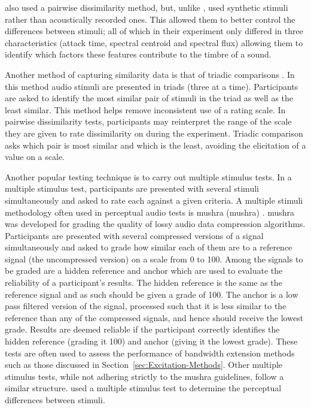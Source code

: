 			\citet{caclin2005acoustic} also used a pairwise dissimilarity method, but, unlike
			\citet{grey1977multidimensional}, used synthetic stimuli rather than acoustically recorded ones.
			This allowed them to better control the differences between stimuli; all of which in their
			experiment only differed in three characteristics (attack time, spectral centroid and spectral
			flux) allowing them to identify which factors these features contribute to the timbre of a sound.

			Another method of capturing similarity data is that of triadic comparisons
			\citep{wickelmaier2007deriving}. In this method audio stimuli are presented in triads (three at a
			time). Participants are asked to identify the most similar pair of stimuli in the triad as well as
			the least similar. This method helps remove inconsistent use of a rating scale. In pairwise
			dissimilarity tests, participants may reinterpret the range of the scale they are given to rate
			dissimilarity on during the experiment. Triadic comparison asks which pair is most similar and
			which is the least, avoiding the elicitation of a value on a scale.

			Another popular testing technique is to carry out multiple stimulus tests. In a multiple stimulus
			test, participants are presented with several stimuli simultaneously and asked to rate each against
			a given criteria. A multiple stimuli methodology often used in perceptual audio tests is
			\acrshort{mushra} (\acrlong{mushra}) \citep{mushra2014}. \acrshort{mushra} was developed for
			grading the quality of lossy audio data compression algorithms. Participants are presented with
			several compressed versions of a signal simultaneously and asked to grade how similar each of them
			are to a reference signal (the uncompressed version) on a scale from 0 to 100.  Among the signals
			to be graded are a hidden reference and anchor which are used to evaluate the reliability of a
			participant's results. The hidden reference is the same as the reference signal and as such should
			be given a grade of 100. The anchor is a low pass filtered version of the signal, processed such
			that it is less similar to the reference than any of the compressed signals, and hence should
			receive the lowest grade. Results are deemed reliable if the participant correctly identifies the
			hidden reference (grading it 100) and anchor (giving it the lowest grade). These tests are often
			used to assess the performance of bandwidth extension methods such as those discussed in
			Section~\ref{sec:Excitation-Methods}. Other multiple stimulus tests, while not adhering strictly to
			the \acrshort{mushra} guidelines, follow a similar structure.  \citet{arthi2015influence} used a
			multiple stimulus test to determine the perceptual differences between stimuli. 
			
